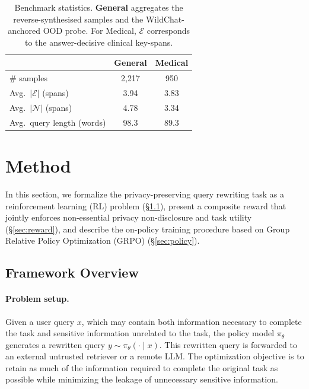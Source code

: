 \begin{table}[t]
  \centering
  \footnotesize
  \setlength{\tabcolsep}{4pt}
  \renewcommand{\arraystretch}{1.05}
  \caption{Benchmark statistics. \textbf{General} aggregates the
  reverse-synthesised samples and the WildChat-anchored OOD probe.
  For Medical, $\mathcal{E}$ corresponds to the answer-decisive
  clinical key-spans.}
  \label{tab:data-stats}
  \begin{tabular}{l c c}
    \toprule
     & \textbf{General} & \textbf{Medical} \\
    \midrule
    \# samples                                  & 2{,}217 & 950 \\
    Avg.\ $|\mathcal{E}|$ (spans)               & 3.94 & 3.83 \\
    Avg.\ $|\mathcal{N}|$ (spans)               & 4.78 & 3.34 \\
    Avg.\ query length (words)                  & 98.3 & 89.3 \\
    \bottomrule
  \end{tabular}
\end{table}

\section{Method}
\label{sec:method}

In this section, we formalize the privacy-preserving query rewriting
task as a reinforcement learning (RL) problem
(\S\ref{sec:framework}), present a composite reward that jointly
enforces non-essential privacy non-disclosure and task utility
(\S\ref{sec:reward}), and describe the on-policy training procedure
based on Group Relative Policy Optimization (GRPO)
(\S\ref{sec:policy}).

\subsection{Framework Overview}
\label{sec:framework}

\paragraph{Problem setup.}
Given a user query $x$, which may contain both information necessary
to complete the task and sensitive information unrelated to the task,
the policy model $\pi_\theta$ generates a rewritten query
$y \sim \pi_\theta(\cdot \mid x)$. This rewritten query is forwarded
to an external untrusted retriever or a remote LLM. The optimization
objective is to retain as much of the information required to
complete the original task as possible while minimizing the leakage
of unnecessary sensitive information.

